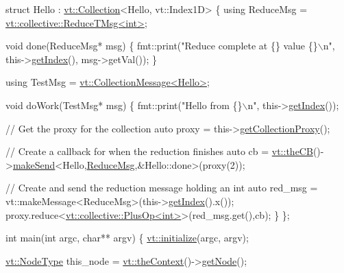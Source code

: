 \begin{DoxyCodeInclude}
\textcolor{keyword}{struct }Hello : \hyperlink{structvt_1_1vrt_1_1collection_1_1_collection}{vt::Collection}<Hello, vt::Index1D> \{
  \textcolor{keyword}{using} ReduceMsg = \hyperlink{structvt_1_1collective_1_1reduce_1_1operators_1_1_reduce_t_msg}{vt::collective::ReduceTMsg<int>};

  \textcolor{keywordtype}{void} done(ReduceMsg* msg) \{
    fmt::print(\textcolor{stringliteral}{"Reduce complete at \{\} value \{\}\(\backslash\)n"}, this->\hyperlink{structvt_1_1vrt_1_1collection_1_1_indexable_a28d05f23e7a20e12e94b8235305c1e82}{getIndex}(), msg->getVal());
  \}

  \textcolor{keyword}{using} TestMsg = \hyperlink{structvt_1_1vrt_1_1collection_1_1_collection_message}{vt::CollectionMessage<Hello>};

  \textcolor{keywordtype}{void} doWork(TestMsg* msg) \{
    fmt::print(\textcolor{stringliteral}{"Hello from \{\}\(\backslash\)n"}, this->\hyperlink{structvt_1_1vrt_1_1collection_1_1_indexable_a28d05f23e7a20e12e94b8235305c1e82}{getIndex}());

    \textcolor{comment}{// Get the proxy for the collection}
    \textcolor{keyword}{auto} proxy = this->\hyperlink{structvt_1_1vrt_1_1collection_1_1_collection_base_ad97d9ab1a28fb535c5d7f82c15e99791}{getCollectionProxy}();

    \textcolor{comment}{// Create a callback for when the reduction finishes}
    \textcolor{keyword}{auto} cb = \hyperlink{namespacevt_a673b109e94c7bca58313504c83e1da94}{vt::theCB}()->\hyperlink{structvt_1_1pipe_1_1_pipe_manager_a73583be6260418b13ee66e56cdade2da}{makeSend}<Hello,\hyperlink{namespacevt_1_1collective_a4c5bf7769ad4396573d6bcc85ec430a4}{ReduceMsg},&Hello::done>(proxy(2));

    \textcolor{comment}{// Create and send the reduction message holding an int}
    \textcolor{keyword}{auto} red\_msg = vt::makeMessage<ReduceMsg>(this->\hyperlink{structvt_1_1vrt_1_1collection_1_1_indexable_a28d05f23e7a20e12e94b8235305c1e82}{getIndex}().x());
    proxy.reduce<\hyperlink{structvt_1_1collective_1_1reduce_1_1operators_1_1_plus_op}{vt::collective::PlusOp<int>}>(red\_msg.get(),cb);
  \}
\};

\textcolor{keywordtype}{int} main(\textcolor{keywordtype}{int} argc, \textcolor{keywordtype}{char}** argv) \{
  \hyperlink{namespacevt_aaa266774ea8339c58be0202b00fafa62}{vt::initialize}(argc, argv);

  \hyperlink{namespacevt_a866da9d0efc19c0a1ce79e9e492f47e2}{vt::NodeType} this\_node = \hyperlink{namespacevt_a26551fe0e6e6a1371111df5b12c7e92c}{vt::theContext}()->\hyperlink{structvt_1_1ctx_1_1_context_a0d52c263ce8516546a67443d9a86fa5f}{getNode}();


\end{DoxyCodeInclude}
